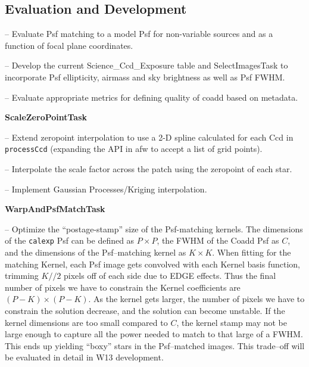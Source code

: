 \documentclass[prd, nofootinbib, floatfix, 11pt,tightenlines,times]{article}
\begin{document}
\subsection{Evaluation and Development}

-- Evaluate Psf matching to a model Psf for non-variable sources and
as a function of focal plane coordinates. 

-- Develop the current Science\_Ccd\_Exposure table and
SelectImagesTask to incorporate  Psf ellipticity, airmass and sky
brightness as well as Psf FWHM.

-- Evaluate appropriate metrics for defining quality of coadd  based
on metadata.


{\bf ScaleZeroPointTask}

-- Extend zeropoint interpolation to use a 2-D spline calculated for each Ccd in {\tt
  processCcd} (expanding  the API in afw to accept a list of grid points).

-- Interpolate the scale factor across the patch using the zeropoint
of each star. 

-- Implement Gaussian Processes/Kriging interpolation.

{\bf WarpAndPsfMatchTask}

-- Optimize the ``postage-stamp'' size of the Psf-matching kernels.
The dimensions of the {\tt calexp} Psf can be defined as $P \times P$,
the FWHM of the Coadd Psf as $C$, and the dimensions of the
Psf--matching kernel as $K \times K$.  When fitting for the matching
Kernel, each Psf image gets convolved with each Kernel basis function,
trimming $K//2$ pixels off of each side due to EDGE effects.  Thus the
final number of pixels we have to constrain the Kernel coefficients
are $(P-K) \times (P-K)$.  As the kernel gets larger, the number of
pixels we have to constrain the solution decrease, and the solution
can become unstable.  If the kernel dimensions are too small compared
to $C$, the kernel stamp may not be large enough to capture all the
power needed to match to that large of a FWHM.  This ends up yielding
``boxy'' stars in the Psf--matched images.  
This trade--off will be evaluated in detail in W13 development.
\end{document}
